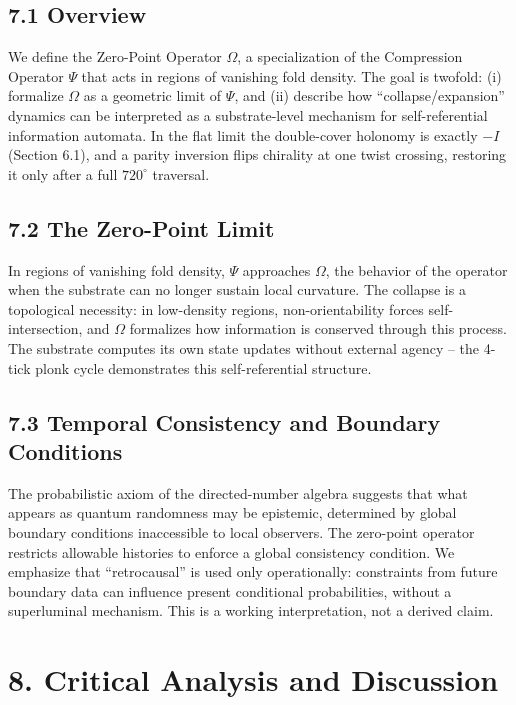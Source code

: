 \documentclass[
  11pt,
]{article}
\begin{document}
\subsection{7.1 Overview}\label{overview-2}

We define the Zero-Point Operator \(\Omega\), a specialization of the
Compression Operator \(\Psi\) that acts in regions of vanishing fold
density. The goal is twofold: (i) formalize \(\Omega\) as a geometric
limit of \(\Psi\), and (ii) describe how ``collapse/expansion'' dynamics
can be interpreted as a substrate-level mechanism for self-referential
information automata. In the flat limit the double-cover holonomy is
exactly \(-I\) (Section 6.1), and a parity inversion flips chirality at
one twist crossing, restoring it only after a full \(720^{\circ}\)
traversal.

\subsection{7.2 The Zero-Point Limit}\label{the-zero-point-limit}

In regions of vanishing fold density, \(\Psi\) approaches \(\Omega\),
the behavior of the operator when the substrate can no longer sustain
local curvature. The collapse is a topological necessity: in low-density
regions, non-orientability forces self-intersection, and \(\Omega\)
formalizes how information is conserved through this process. The
substrate computes its own state updates without external agency -- the
4-tick plonk cycle demonstrates this self-referential structure.

\subsection{7.3 Temporal Consistency and Boundary
Conditions}\label{temporal-consistency-and-boundary-conditions}

The probabilistic axiom of the directed-number algebra suggests that
what appears as quantum randomness may be epistemic, determined by
global boundary conditions inaccessible to local observers. The
zero-point operator restricts allowable histories to enforce a global
consistency condition. We emphasize that ``retrocausal'' is used only
operationally: constraints from future boundary data can influence
present conditional probabilities, without a superluminal mechanism.
This is a working interpretation, not a derived claim.

\section{8. Critical Analysis and
Discussion}\label{critical-analysis-and-discussion}
\end{document}
